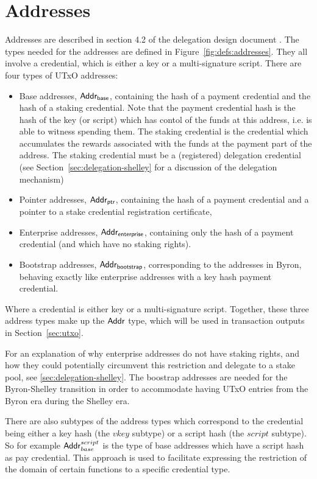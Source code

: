 \section{Addresses}
\label{sec:addresses}

Addresses are described in section 4.2 of the delegation design document \cite{delegation_design}.
The types needed for the addresses are defined in Figure~\ref{fig:defs:addresses}.
They all involve a credential, which is either a key or a multi-signature script.
There are four types of UTxO addresses:
\begin{itemize}
\item Base addresses, $\mathsf{Addr_{base}}$, containing the hash of a payment credential and
  the hash of a staking credential. Note that the payment credential hash is the
  hash of the key (or script) which has contol of the funds at this address,
  i.e. is able to witness spending
  them. The staking credential is the credential which accumulates
  the rewards associated with the funds at the payment part of the address.
  The staking credential
  must be a (registered) delegation credential (see Section~\ref{sec:delegation-shelley}
  for a discussion of the delegation mechanism)
\item Pointer addresses, $\mathsf{Addr_{ptr}}$, containing the hash of a payment credential
  and a pointer to a stake credential registration certificate,
\item Enterprise addresses, $\mathsf{Addr_{enterprise}}$,
  containing only the hash of a payment credential (and which have no staking rights).
\item Bootstrap addresses, $\mathsf{Addr_{bootstrap}}$, corresponding to the addresses in
  Byron, behaving exactly like enterprise addresses with a key hash
  payment credential.
\end{itemize}

\noindent Where a credential is either key or a multi-signature script. Together, these
three address types make up the $\mathsf{Addr}$ type, which will be used in transaction
outputs in Section~\ref{sec:utxo}.

For an explanation of why enterprise addresses do not have staking rights,
and how they could potentially circumvent this restriction and delegate to a
stake pool, see \ref{sec:delegation-shelley}.
The boostrap addresses are needed for the Byron-Shelley transition in order to
accommodate having UTxO entries from the Byron era during the Shelley era.

There are also subtypes of the address types which correspond to the credential
being either a key hash (the $vkey$ subtype) or a script hash (the $script$
subtype). So for example $\mathsf{Addr}_{base}^{script}$ is the type of base addresses
which have a script hash as pay credential. This approach is used to facilitate
expressing the restriction of the domain of certain functions to a specific
credential type.

